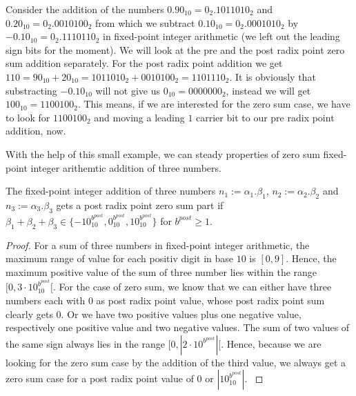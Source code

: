 \begin{example}
    Consider the addition of the numbers $0.90_{10} = 0_{2}.1011010_{2}$ and $0.20_{10} = 0_{2}.0010100_{2}$ from which we subtract $0.10_{10} = 0_{2}.0001010_{2}$ by $-0.10_{10} = 0_{2}.1110110_{2}$ in fixed-point integer arithmetic (we left out the leading sign bits for the moment). We will look at the pre and the post radix point zero sum addition separately. For the post radix point addition we get $110 = 90_{10} + 20_{10} = 1011010_{2} + 0010100_{2} = 1101110_{2}$. It is obviously that substracting $-0.10_{10}$ will not give us $0_{10} = 0000000_{2}$, instead we will get $100_{10} = 1100100_{2}$. This means, if we are interested for the zero sum case, we have to look for $1100100_{2}$ and moving a leading $1$ carrier bit to our pre radix point addition, now.
\label{example:fixedpointintegerarithmeticaddition}
\end{example}

With the help of this small example, we can steady properties of zero sum fixed-point integer arithemtic addition of three numbers.

\begin{theorem}
    The fixed-point integer addition of three numbers $n_{1} := \alpha_{1}.\beta_{1}$, $n_{2} := \alpha_{2}.\beta_{2}$ and $n_{3} := \alpha_{3}.\beta_{3}$ gets a post radix point zero sum part if $\beta_{1} + \beta_{2} + \beta_{3} \in \{ -10^{b^{post}}_{10}, 0^{b^{post}}_{10}, 10^{b^{post}}_{10} \}$ for $b^{post} \geq 1$.
\label{theorem:postradixpointzerosum}
\end{theorem}

\begin{proof}
    For a sum of three numbers in fixed-point integer arithmetic, the maximum range of value for each positiv digit in base $10$ is $[0,9]$. Hence, the maximum positive value of the sum of three number lies within the range $[0, 3\cdot 10_{10}^{b^{post}}[$. For the case of zero sum, we know that we can either have three numbers each with $0$ as post radix point value, whose post radix point sum clearly gets $0$. Or we have two positive values plus one negative value, respectively one positive value and two negative values. The sum of two values of the same sign always lies in the range $[0, |2\cdot 10^{b^{post}}|[$. Hence, because we are looking for the zero sum case by the addition of the third value, we always get a zero sum case for a post radix point value of $0$ or $|10_{10}^{b^{post}}|$.
\label{proof:postradixpointzerosum}
\end{proof}

